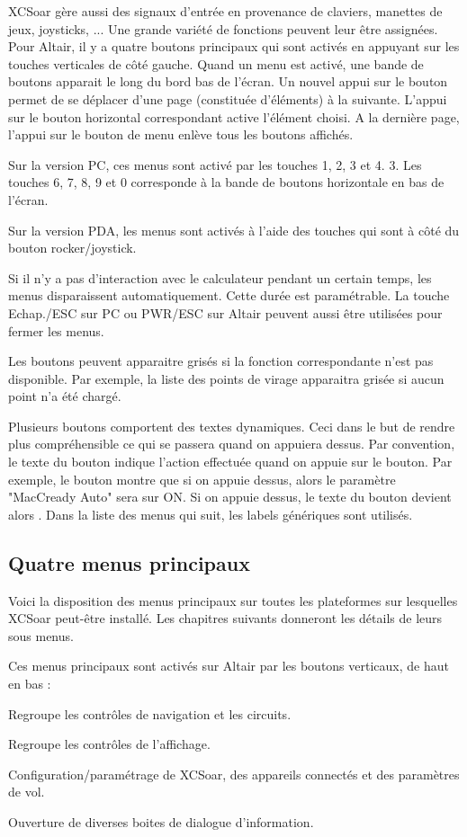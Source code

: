 XCSoar gère aussi des signaux d'entrée en provenance de claviers, manettes de jeux, joysticks, ... Une grande variété de fonctions peuvent leur être assignées.
Pour Altair, il y a quatre boutons principaux qui sont activés en appuyant sur les touches verticales de côté gauche. Quand un menu est activé, une bande de boutons apparait le long du bord bas de l'écran. Un nouvel appui sur le bouton permet de se déplacer d'une page (constituée d'éléments) à la suivante. L'appui sur le bouton horizontal correspondant active l'élément choisi. A la dernière page, l'appui sur le bouton de menu enlève tous les boutons affichés.

Sur la version PC, ces menus sont activé par les touches 1, 2, 3 et 4. 3. Les touches 6, 7, 8, 9 et 0 corresponde à la bande de boutons horizontale en bas de l'écran.

Sur la version PDA, les menus sont activés à l'aide des touches qui sont à côté du bouton rocker/joystick.

Si il n'y a pas d'interaction avec le calculateur pendant un certain temps, les menus disparaissent automatiquement. Cette durée est paramétrable. La touche Echap./ESC sur PC ou PWR/ESC sur Altair peuvent aussi être utilisées pour fermer les menus.

Les boutons peuvent apparaitre grisés si la fonction correspondante n'est pas disponible. Par exemple, la liste des points de virage apparaitra grisée si aucun point n'a été chargé.

Plusieurs boutons comportent des textes dynamiques. Ceci dans le but de rendre plus compréhensible ce qui se passera quand on appuiera dessus. Par convention, le texte du bouton indique l'action effectuée quand on appuie sur le bouton. Par exemple, le bouton  montre que si on appuie dessus, alors le paramètre "MacCready Auto" sera sur ON. Si on appuie dessus, le texte du bouton devient alors . Dans la liste des menus qui suit, les labels génériques sont utilisés.

\subsection*{Quatre menus principaux}
Voici la disposition des menus principaux sur toutes les plateformes sur lesquelles XCSoar peut-être installé. Les chapitres suivants donneront les détails de leurs sous menus.

Ces menus principaux sont activés sur Altair par les boutons verticaux, de haut en bas :
\begin{jspecs}
\item[\bmenu{Nav.}] Regroupe les contrôles de navigation et les circuits.
\item[\bmenu{Affich.}] Regroupe les contrôles de l'affichage.
\item[\bmenu{Config.}] Configuration/paramétrage de XCSoar, des appareils connectés et des paramètres de vol.
\item[\bmenu{Info.}] Ouverture de diverses boites de dialogue d'information.
\end{jspecs}

